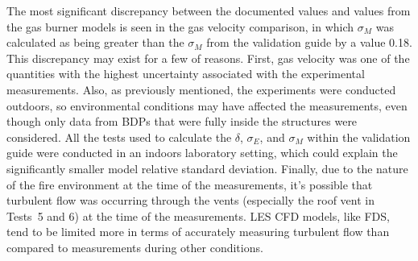 The most significant discrepancy between the documented values and values from the gas burner models is seen in the gas velocity comparison, in which $\sigma_M$ was calculated as being greater than the $\sigma_M$ from the validation guide by a value 0.18. This discrepancy may exist for a few of reasons. First, gas velocity was one of the quantities with the highest uncertainty associated with the experimental measurements. Also, as previously mentioned, the experiments were conducted outdoors, so environmental conditions may have affected the measurements, even though only data from BDPs that were fully inside the structures were considered. All the tests used to calculate the $\delta$, $\sigma_E$, and $\sigma_M$ within the validation guide were conducted in an indoors laboratory setting, which could explain the significantly smaller model relative standard deviation. Finally, due to the nature of the fire environment at the time of the measurements, it's possible that turbulent flow was occurring through the vents (especially the roof vent in Tests~5 and 6) at the time of the measurements. LES CFD models, like FDS, tend to be limited more in terms of accurately measuring turbulent flow than compared to measurements during other conditions.
